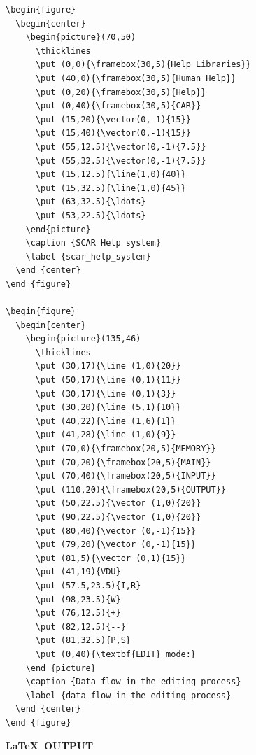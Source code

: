 \documentclass[twoside,11pt]{article}
\renewcommand{\_}{\texttt{\symbol{95}}}
\begin{document}
\small
\begin{verbatim}
\begin{figure}
  \begin{center}
    \begin{picture}(70,50)
      \thicklines
      \put (0,0){\framebox(30,5){Help Libraries}}
      \put (40,0){\framebox(30,5){Human Help}}
      \put (0,20){\framebox(30,5){Help}}
      \put (0,40){\framebox(30,5){CAR}}
      \put (15,20){\vector(0,-1){15}}
      \put (15,40){\vector(0,-1){15}}
      \put (55,12.5){\vector(0,-1){7.5}}
      \put (55,32.5){\vector(0,-1){7.5}}
      \put (15,12.5){\line(1,0){40}}
      \put (15,32.5){\line(1,0){45}}
      \put (63,32.5){\ldots}
      \put (53,22.5){\ldots}
    \end{picture}
    \caption {SCAR Help system}
    \label {scar_help_system}
  \end {center}
\end {figure}

\begin{figure}
  \begin{center}
    \begin{picture}(135,46)
      \thicklines
      \put (30,17){\line (1,0){20}}
      \put (50,17){\line (0,1){11}}
      \put (30,17){\line (0,1){3}}
      \put (30,20){\line (5,1){10}}
      \put (40,22){\line (1,6){1}}
      \put (41,28){\line (1,0){9}}
      \put (70,0){\framebox(20,5){MEMORY}}
      \put (70,20){\framebox(20,5){MAIN}}
      \put (70,40){\framebox(20,5){INPUT}}
      \put (110,20){\framebox(20,5){OUTPUT}}
      \put (50,22.5){\vector (1,0){20}}
      \put (90,22.5){\vector (1,0){20}}
      \put (80,40){\vector (0,-1){15}}
      \put (79,20){\vector (0,-1){15}}
      \put (81,5){\vector (0,1){15}}
      \put (41,19){VDU}
      \put (57.5,23.5){I,R}
      \put (98,23.5){W}
      \put (76,12.5){+}
      \put (82,12.5){--}
      \put (81,32.5){P,S}
      \put (0,40){\textbf{EDIT} mode:}
    \end {picture}
    \caption {Data flow in the editing process}
    \label {data_flow_in_the_editing_process}
  \end {center}
\end {figure}
\end{verbatim}
\normalsize

\newpage

\begin{center}
  \textbf{\LaTeX\ OUTPUT}
\end{center}
\end{document}
